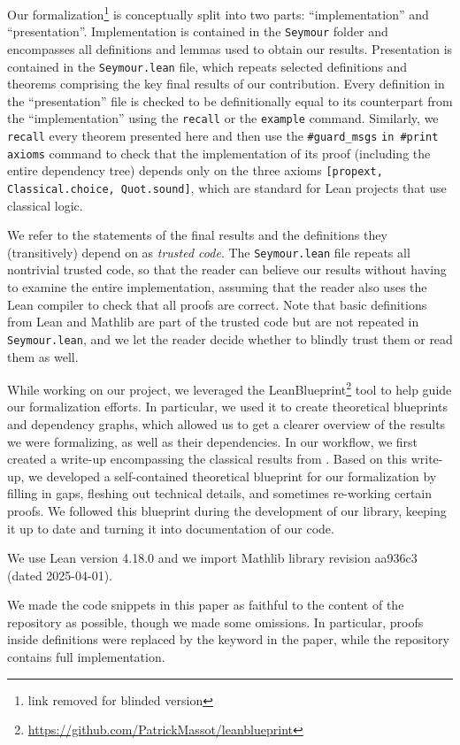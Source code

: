Our formalization\footnote{link removed for blinded version} is conceptually split into two parts: ``implementation'' and ``presentation''. Implementation is contained in the \texttt{Seymour} folder and encompasses all definitions and lemmas used to obtain our results. Presentation is contained in the \texttt{Seymour.lean} file, which repeats selected definitions and theorems comprising the key final results of our contribution. Every definition in the ``presentation'' file is checked to be definitionally equal to its counterpart from the ``implementation'' using the \texttt{recall} or the \texttt{example} command. Similarly, we \texttt{recall} every theorem presented here and then use the \texttt{\#guard\_msgs} \texttt{in \#print} \texttt{axioms} \hbox{command} to check that the implementation of its proof (including the entire dependency tree) depends only on the three axioms \texttt{[propext, Classical.choice, Quot.sound]}, which are standard for Lean projects that use classical logic. %

We refer to the statements of the final results and the definitions they (transitively) depend on as \emph{trusted code}. The \texttt{Seymour.lean} file repeats all nontrivial trusted code, so that the reader can believe \cite{Pollack1997} our results without having to examine the entire implementation, assuming that the reader also uses the Lean compiler to check that all proofs are correct. Note that basic definitions from Lean and Mathlib are part of the trusted code but are not repeated in \texttt{Seymour.lean}, and we let the reader decide whether to blindly trust them or read them as well.

While working on our project, we leveraged the LeanBlueprint\footnote{\url{https://github.com/PatrickMassot/leanblueprint}} tool to help guide our formalization efforts. In particular, we used it to create theoretical blueprints and dependency graphs, which allowed us to get a clearer overview of the results we were formalizing, as well as their dependencies. In our workflow, we first created a write-up encompassing the classical results from \cite{Truemper2016}. Based on this write-up, we developed a self-contained theoretical blueprint for our formalization by filling in gaps, fleshing out technical details, and sometimes re-working certain proofs. We followed this blueprint during the development of our library, keeping it up to date and turning it into documentation of our code.

We use Lean version 4.18.0 and we import Mathlib library revision aa936c3 (dated 2025-04-01).

We made the code snippets in this paper as faithful to the content of the repository as possible, though we made some omissions. In particular, proofs inside definitions were replaced by the  keyword in the paper, while the repository contains full implementation.